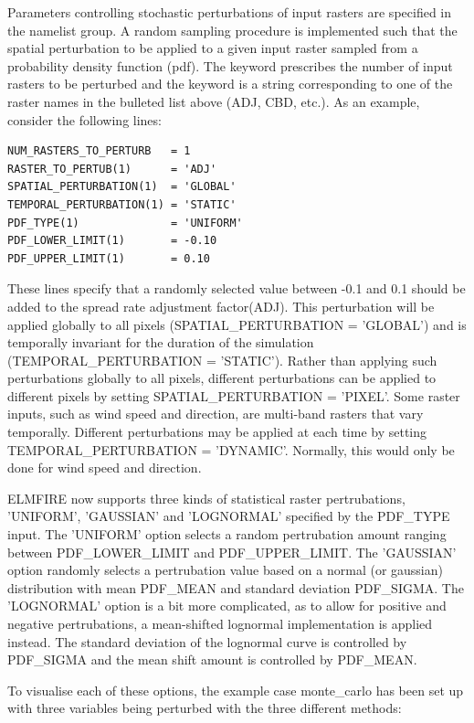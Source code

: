 Parameters controlling stochastic perturbations of input rasters are specified in the  namelist group. A random sampling procedure is implemented such that the spatial perturbation to be applied to a given input raster sampled from a probability density function (pdf). The keyword  prescribes the number of input rasters to be perturbed and the keyword  is a string corresponding to one of the raster names in the bulleted list above (ADJ, CBD, etc.). As an example, consider the following lines:
\begin{verbatim}
NUM_RASTERS_TO_PERTURB   = 1
RASTER_TO_PERTUB(1)      = 'ADJ'
SPATIAL_PERTURBATION(1)  = 'GLOBAL'
TEMPORAL_PERTURBATION(1) = 'STATIC'
PDF_TYPE(1)              = 'UNIFORM'
PDF_LOWER_LIMIT(1)       = -0.10
PDF_UPPER_LIMIT(1)       = 0.10
\end{verbatim}

These lines specify that a randomly selected value between -0.1 and 0.1 should be added to the spread rate adjustment factor(ADJ). This perturbation will be applied globally to all pixels (SPATIAL\_PERTURBATION = 'GLOBAL') and is temporally invariant for the duration of the simulation (TEMPORAL\_PERTURBATION = 'STATIC'). Rather than applying such perturbations globally to all pixels, different perturbations can be applied to different pixels by setting SPATIAL\_PERTURBATION = 'PIXEL'. Some raster inputs, such as wind speed and direction, are multi-band rasters that vary temporally. Different perturbations may be applied at each time by setting TEMPORAL\_PERTURBATION = 'DYNAMIC'. Normally, this would only be done for wind speed and direction.

ELMFIRE now supports three kinds of statistical raster pertrubations, 'UNIFORM', 'GAUSSIAN' and 'LOGNORMAL' specified by the PDF\_TYPE input. The 'UNIFORM' option selects a random pertrubation amount ranging between PDF\_LOWER\_LIMIT and PDF\_UPPER\_LIMIT. The 'GAUSSIAN' option randomly selects a pertrubation value based on a normal (or gaussian) distribution with mean PDF\_MEAN and standard deviation PDF\_SIGMA. The 'LOGNORMAL' option is a bit more complicated, as to allow for positive and negative pertrubations, a mean-shifted lognormal implementation is applied instead. The standard deviation of the lognormal curve is controlled by PDF\_SIGMA and the mean shift amount is controlled by PDF\_MEAN. 

To visualise each of these options, the example case monte\_carlo has been set up with three variables being perturbed with the three different methods:

